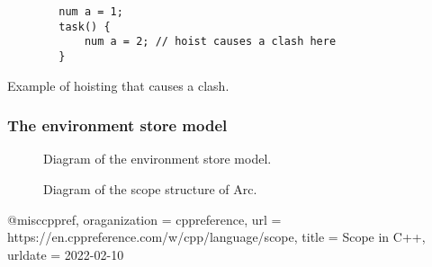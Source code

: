\begin{listing}[htb!]
    \begin{verbatim}
        num a = 1;
        task() {
            num a = 2; // hoist causes a clash here
        }
    \end{verbatim}
    \caption{Example of hoisting that causes a clash.}
    \label{lst:hoistclash}
\end{listing}


\subsubsection{The environment store model}












\begin{figure}[htbp]
    \centering
    \caption{Diagram of the environment store model.}
    \label{fig:envstomodel}
\end{figure}


\begin{figure}[htbp]
    \centering
    \caption{Diagram of the scope structure of Arc.}
    \label{fig:arcscoperules}
\end{figure}


@misc{cppref,
    oraganization       = {cppreference},
    url = {https://en.cppreference.com/w/cpp/language/scope},
    title        = {Scope in C++},
    urldate = {2022-02-10}
}